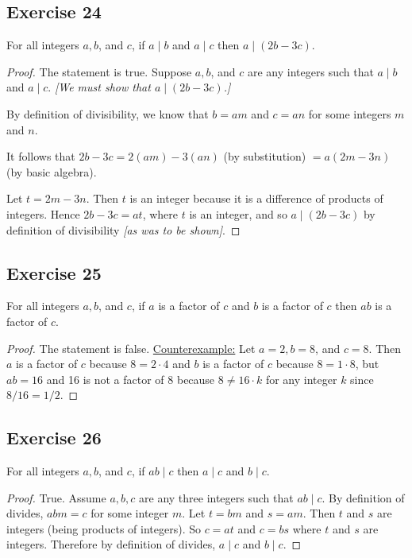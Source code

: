 \documentclass[14pt]{extarticle}
\begin{document}
\subsection{Exercise 24}
For all integers $a, b$, and $c$, if $a \mid b$ and $a \mid c$ then $a \mid (2b - 3c)$.

\begin{proof}
The statement is true. Suppose $a, b$, and $c$ are any integers such that $a\mid b$ and $a\mid c$. {\it [We must show that $a\mid (2b - 3c)$.]} 

By definition of divisibility, we know that $b = am$ and $c = an$ for some integers $m$ and $n$. 

It follows that $2b - 3c = 2(am) - 3(an)$ (by substitution) $= a(2m - 3n)$ (by basic algebra). 

Let $t = 2m - 3n$. Then $t$ is an integer because it is a difference of products of integers. Hence $2b - 3c = at$, where $t$ is an integer, and so $a\mid (2b - 3c)$ by definition of divisibility {\it [as was to be shown]}.
\end{proof}

\subsection{Exercise 25}
For all integers $a, b$, and $c$, if $a$ is a factor of $c$ and $b$ is a factor of $c$ then $ab$ is a factor of $c$.

\begin{proof}
The statement is false. \underline{Counterexample:} Let
$a = 2, b = 8$, and $c = 8$. Then $a$ is a factor of $c$ because $8 = 2\cdot 4$ and $b$ is a factor of $c$ because $8 = 1\cdot8$, but $ab = 16$ and 16 is not a factor of 8 because $8 \neq 16\cdot k$ for any integer $k$ since $8/16 = 1/2$.
\end{proof}

\subsection{Exercise 26}
For all integers $a, b$, and $c$, if $ab \mid c$ then $a \mid c$ and $b \mid c$.

\begin{proof}
True. Assume $a,b,c$ are any three integers such that $ab \mid c$. By definition of divides, $abm = c$ for some integer $m$. Let $t = bm$ and $s = am$. Then $t$ and $s$ are integers (being products of integers). So $c = at$ and $c = bs$ where $t$ and $s$ are integers. Therefore by definition of divides, $a \mid c$ and $b \mid c$.
\end{proof}
\end{document}
